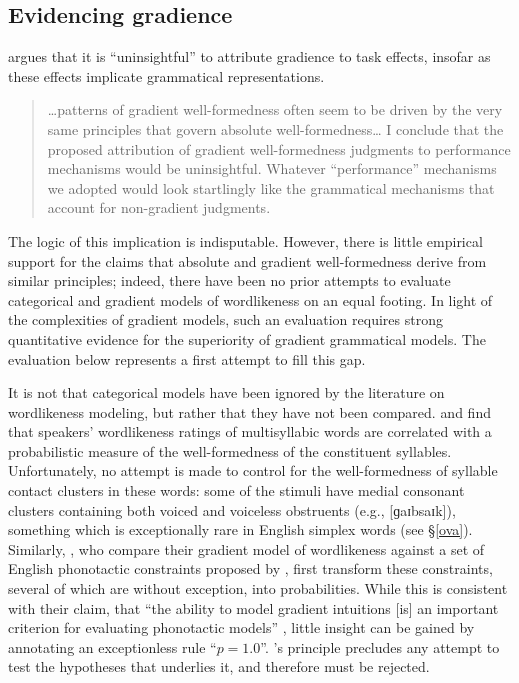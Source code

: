 \subsection{Evidencing gradience}

\citet{Hayes2000} argues that it is ``uninsightful'' to attribute gradience to task effects, insofar as these effects implicate grammatical representations. 


\begin{quote}
\ldots{}patterns of gradient well-formedness often seem to be driven by the very same principles that govern absolute well-formedness\ldots{} I conclude that the proposed attribution of gradient well-formedness judgments to performance mechanisms would be uninsightful. Whatever ``performance'' mechanisms we adopted would look startlingly like the grammatical mechanisms that account for non-gradient judgments. \citep[99]{Hayes2000}
\end{quote}

\noindent
The logic of this implication is indisputable.
However, there is little empirical support for the claims that absolute and gradient well-formedness derive from similar principles; indeed, there have been no prior attempts to evaluate categorical and gradient models of wordlikeness on an equal footing.
In light of the complexities of gradient models, such an evaluation requires strong quantitative evidence for the superiority of gradient grammatical models.
The evaluation below represents a first attempt to fill this gap.

It is not that categorical models have been ignored by the literature on wordlikeness modeling, but rather that they have not been compared.
\citet{Frisch2000} and \citet{Vitevitch1997} find that speakers' wordlikeness ratings of multisyllabic words are correlated with a probabilistic measure of the well-formedness of the constituent syllables. 
Unfortunately, no attempt is made to control for the well-formedness of syllable contact clusters in these words: some of the stimuli have medial consonant clusters containing both voiced and voiceless obstruents (e.g., [ɡaɪbsaɪk]), something which is exceptionally rare in English simplex words (see \S\ref{ova}).
Similarly, \citet{Hayes2008a}, who compare their gradient model of wordlikeness against a set of English phonotactic constraints proposed by \citet{Clements1983}, first transform these constraints, several of which are without exception, into probabilities.
While this is consistent with their claim, that ``the ability to model gradient intuitions [is] an important criterion for evaluating phonotactic models'' \citep[382]{Hayes2008a}, little insight can be gained by annotating an exceptionless rule ``$p = 1.0$''. 
\citeauthor{Hayes2008a}'s principle precludes any attempt to test the hypotheses that underlies it, and therefore must be rejected.

